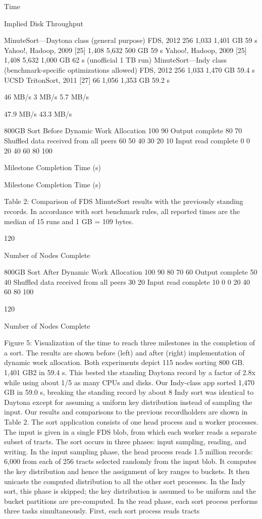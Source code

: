 Time

Implied Disk
Throughput

MinuteSort—Daytona class (general purpose)
FDS, 2012
256
1,033 1,401 GB
59 s
Yahoo!, Hadoop, 2009 [25]
1,408
5,632
500 GB
59 s
Yahoo!, Hadoop, 2009 [25]
1,408
5,632 1,000 GB
62 s
(unofficial 1 TB run)
MinuteSort—Indy class (benchmark-specific optimizations allowed)
FDS, 2012
256
1,033 1,470 GB 59.4 s
UCSD TritonSort, 2011 [27]
66
1,056 1,353 GB 59.2 s

46 MB/s
3 MB/s
5.7 MB/s

47.9 MB/s
43.3 MB/s

800GB Sort Before Dynamic Work Allocation
100
90 Output complete
80
70
Shuffled data received from all peers
60
50
40
30
20
10 Input read complete
0
0
20
40
60
80
100

Milestone Completion Time (s)

Milestone Completion Time (s)

Table 2: Comparison of FDS MinuteSort results with the previously standing records. In accordance with sort benchmark rules, all reported times are the median of 15 runs and 1 GB = 109 bytes.

120

Number of Nodes Complete

800GB Sort After Dynamic Work Allocation
100
90
80
70
60 Output complete
50
40 Shuffled data received from all peers
30
20 Input read complete
10
0
0
20
40
60
80
100

120

Number of Nodes Complete

Figure 5: Visualization of the time to reach three milestones in the completion of a sort. The results are shown before
(left) and after (right) implementation of dynamic work allocation. Both experiments depict 115 nodes sorting 800 GB.
1,401 GB2 in 59.4 s. This bested the standing Daytona
record by a factor of 2.8x while using about 1/5 as many
CPUs and disks. Our Indy-class app sorted 1,470 GB in
59.0 s, breaking the standing record by about 8%
Indy sort was identical to Daytona except for assuming
a uniform key distribution instead of sampling the input. Our results and comparisons to the previous recordholders are shown in Table 2. The sort application consists of one head process and n worker processes. The
input is given in a single FDS blob, from which each
worker reads a separate subset of tracts. The sort occurs
in three phases: input sampling, reading, and writing.
In the input sampling phase, the head process reads
1.5 million records: 6,000 from each of 256 tracts selected randomly from the input blob. It computes the key
distribution and hence the assignment of key ranges to
buckets. It then unicasts the computed distribution to all
the other sort processes. In the Indy sort, this phase is
skipped; the key distribution is assumed to be uniform
and the bucket partitions are pre-computed.
In the read phase, each sort process performs three
tasks simultaneously. First, each sort process reads tracts

